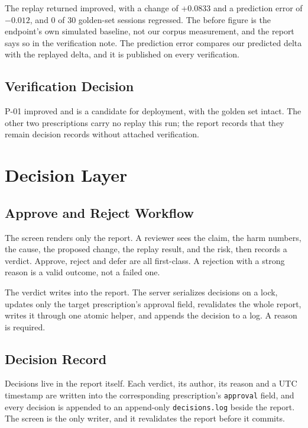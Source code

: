 \documentclass[8pt,twocolumn,a4paper]{extarticle}
\begin{document}
The replay returned improved, with a change of +0.0833 and a prediction
error of $-0.012$, and 0 of 30 golden-set sessions regressed. The before
figure is the endpoint's own simulated baseline, not our corpus
measurement, and the report says so in the verification note. The
prediction error compares our predicted delta with the replayed delta,
and it is published on every verification.

\subsection{Verification Decision}

P-01 improved and is a candidate for deployment, with the golden set
intact. The other two prescriptions carry no replay this run; the report
records that they remain decision records without attached verification.


\section{Decision Layer}

\subsection{Approve and Reject Workflow}

The screen renders only the report. A reviewer sees the claim, the harm
numbers, the cause, the proposed change, the replay result, and the
risk, then records a verdict. Approve, reject and defer are all
first-class. A rejection with a strong reason is a valid outcome, not a
failed one.

The verdict writes into the report. The server serializes decisions on a
lock, updates only the target prescription's approval field, revalidates
the whole report, writes it through one atomic helper, and appends the
decision to a log. A reason is required.

\subsection{Decision Record}

Decisions live in the report itself. Each verdict, its author, its reason
and a UTC timestamp are written into the corresponding prescription's
\texttt{approval} field, and every decision is appended to an append-only
\texttt{decisions.log} beside the report. The screen is the only writer,
and it revalidates the report before it commits.
\end{document}
